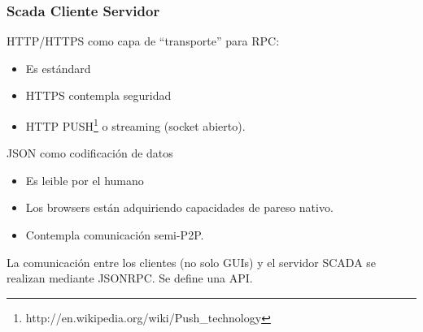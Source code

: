 \documentclass{beamer}
\begin{document}
\begin{frame}
  \frametitle{Scada Cliente Servidor}
  HTTP/HTTPS como capa de ``transporte'' para RPC:
  \begin{itemize}
    \item Es estándard
    \item HTTPS contempla seguridad
    \item HTTP PUSH\footnote{http://en.wikipedia.org/wiki/Push\_technology} o streaming (socket abierto).
  \end{itemize}
  JSON como codificación de datos
  \begin{itemize}
   \item Es leible por el humano
   \item Los browsers están adquiriendo capacidades de pareso nativo.
   \item Contempla comunicación semi-P2P.
  \end{itemize}

  La comunicación entre los clientes (no solo GUIs) y el servidor SCADA 
  se realizan mediante JSONRPC. Se define una API.
\end{frame}
\end{document}
